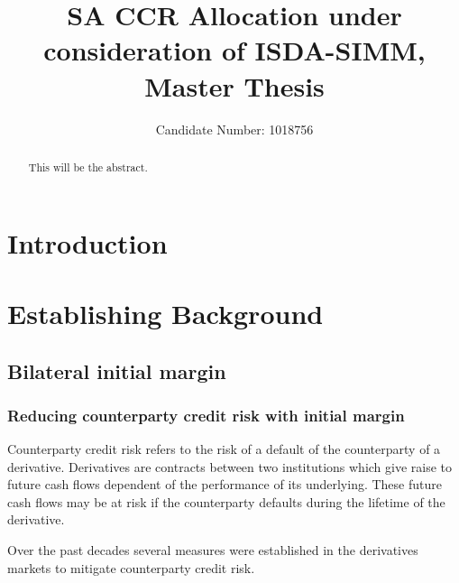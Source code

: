 \documentclass[12pt,a4paper]{article}
\title{SA CCR Allocation under consideration of ISDA-SIMM, Master Thesis}
\author{Candidate Number: 1018756}
\begin{document}
\maketitle

\thispagestyle{empty}

\newpage
\setcounter{page}{1}



\begin{abstract}
This will be the abstract.
\end{abstract}

\section{Introduction}

\section{Establishing Background}
\subsection{Bilateral initial margin}
\subsubsection{Reducing counterparty credit risk with initial margin}
Counterparty credit risk refers to the risk of a default of the counterparty of a derivative. Derivatives are contracts between two institutions which give raise to future cash flows dependent of the performance of its underlying. These future cash flows may be at risk if the counterparty defaults during the lifetime of the derivative. 

Over the past decades several measures were established in the derivatives markets to mitigate counterparty credit risk.
\end{document}
